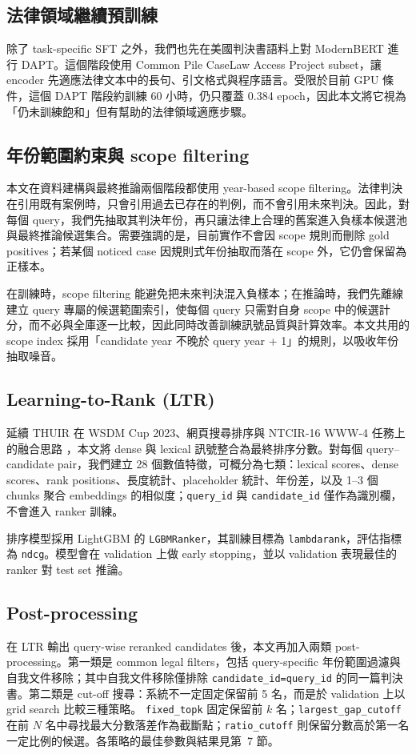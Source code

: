 \subsection{法律領域繼續預訓練}

除了 task-specific SFT 之外，我們也先在美國判決書語料上對 ModernBERT 進行 DAPT。這個階段使用 Common Pile CaseLaw Access Project subset，讓 encoder 先適應法律文本中的長句、引文格式與程序語言。受限於目前 GPU 條件，這個 DAPT 階段約訓練 60 小時，仍只覆蓋 0.384 epoch，因此本文將它視為「仍未訓練飽和」但有幫助的法律領域適應步驟。

\subsection{年份範圍約束與 scope filtering}

本文在資料建構與最終推論兩個階段都使用 year-based scope filtering。法律判決在引用既有案例時，只會引用過去已存在的判例，而不會引用未來判決。因此，對每個 query，我們先抽取其判決年份，再只讓法律上合理的舊案進入負樣本候選池與最終推論候選集合。需要強調的是，目前實作不會因 scope 規則而刪除 gold positives；若某個 noticed case 因規則式年份抽取而落在 scope 外，它仍會保留為正樣本。

在訓練時，scope filtering 能避免把未來判決混入負樣本；在推論時，我們先離線建立 query 專屬的候選範圍索引，使每個 query 只需對自身 scope 中的候選計分，而不必與全庫逐一比較，因此同時改善訓練訊號品質與計算效率。本文共用的 scope index 採用「candidate year 不晚於 query year + 1」的規則，以吸收年份抽取噪音。

\subsection{Learning-to-Rank (LTR)}

延續 THUIR 在 WSDM Cup 2023、網頁搜尋排序與 NTCIR-16 WWW-4 任務上的融合思路 \cite{chen2023wsdmcup,li2023websearch,yang2023ntcir}，本文將 dense 與 lexical 訊號整合為最終排序分數。對每個 query--candidate pair，我們建立 28 個數值特徵，可概分為七類：lexical scores、dense scores、rank positions、長度統計、placeholder 統計、年份差，以及 1--3 個 chunks 聚合 embeddings 的相似度；\texttt{query\_id} 與 \texttt{candidate\_id} 僅作為識別欄，不會進入 ranker 訓練。

排序模型採用 LightGBM 的 \texttt{LGBMRanker}，其訓練目標為 \texttt{lambdarank}，評估指標為 \texttt{ndcg}。模型會在 validation 上做 early stopping，並以 validation 表現最佳的 ranker 對 test set 推論。

\subsection{Post-processing}

在 LTR 輸出 query-wise reranked candidates 後，本文再加入兩類 post-processing。第一類是 common legal filters，包括 query-specific 年份範圍過濾與自我文件移除；其中自我文件移除僅排除 \texttt{candidate\_id=query\_id} 的同一篇判決書。第二類是 cut-off 搜尋：系統不一定固定保留前 5 名，而是於 validation 上以 grid search 比較三種策略。 \texttt{fixed\_topk} 固定保留前 $k$ 名；\texttt{largest\_gap\_cutoff} 在前 $N$ 名中尋找最大分數落差作為截斷點；\texttt{ratio\_cutoff} 則保留分數高於第一名一定比例的候選。各策略的最佳參數與結果見第~7 節。
